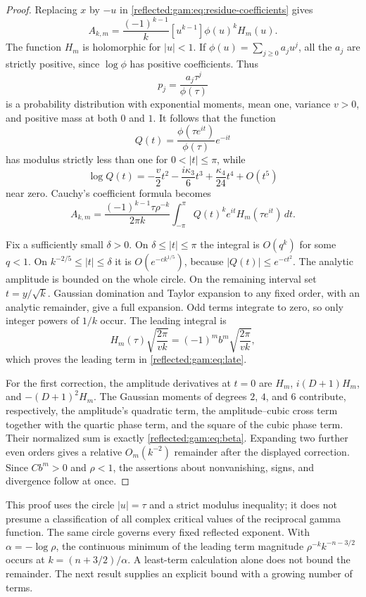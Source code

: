 \begin{proof}
Replacing $x$ by $-u$ in \eqref{reflected:gam:eq:residue-coefficients} gives
\[
 A_{k,m}=\frac{(-1)^{k-1}}k[u^{k-1}]\phi(u)^k H_m(u).
\]
The function $H_m$ is holomorphic for $|u|<1$.  If
$\phi(u)=\sum_{j\ge0}a_ju^j$, all the $a_j$ are strictly positive,
since $\log\phi$ has positive coefficients.  Thus
\[
 p_j=\frac{a_j\tau^j}{\phi(\tau)}
\]
is a probability distribution with exponential moments, mean one,
variance $v>0$, and positive mass at both $0$ and $1$.  It follows
that the function
\[
 Q(t)=\frac{\phi(\tau e^{it})}{\phi(\tau)}e^{-it}
\]
has modulus strictly less than one for $0<|t|\le\pi$, while
\[
 \log Q(t)=-\frac v2t^2-\frac{i\kappa_3}6t^3
 +\frac{\kappa_4}{24}t^4+O(t^5)
\]
near zero.  Cauchy's coefficient formula becomes
\begin{equation}\label{reflected:gam:eq:cauchy}
 A_{k,m}=
 \frac{(-1)^{k-1}\tau\rho^{-k}}{2\pi k}
 \int_{-\pi}^{\pi}Q(t)^k e^{it}H_m(\tau e^{it})\,dt.
\end{equation}

Fix a sufficiently small $\delta>0$.  On $\delta\le|t|\le\pi$
the integral is $O(q^k)$ for some $q<1$.  On
$k^{-2/5}\le|t|\le\delta$ it is $O(e^{-c k^{1/5}})$, because
$|Q(t)|\le e^{-ct^2}$.  The analytic amplitude is bounded on the
whole circle.  On the remaining interval set $t=y/\sqrt{k}$.
Gaussian domination and Taylor expansion to any fixed order, with
an analytic remainder, give a full expansion.  Odd terms integrate
to zero, so only integer powers of $1/k$ occur.  The leading integral is
\[
 H_m(\tau)\sqrt{\frac{2\pi}{vk}}
 =(-1)^m b^m\sqrt{\frac{2\pi}{vk}},
\]
which proves the leading term in \eqref{reflected:gam:eq:late}.

For the first correction, the amplitude derivatives at $t=0$ are
$H_m$, $i(D+1)H_m$, and $-(D+1)^2H_m$.
The Gaussian moments of degrees $2$, $4$, and $6$ contribute,
respectively, the amplitude's quadratic term, the amplitude--cubic
cross term together with the quartic phase term, and the square of
the cubic phase term.  Their normalized sum is exactly
\eqref{reflected:gam:eq:beta}.  Expanding two further even orders gives a
relative $O_m(k^{-2})$ remainder after the displayed correction.
Since $C b^m>0$ and $\rho<1$, the assertions about nonvanishing,
signs, and divergence follow at once.
\end{proof}

This proof uses the circle $|u|=\tau$ and a strict modulus inequality;
it does not presume a classification of all complex critical values
of the reciprocal gamma function.  The same circle governs every fixed
reflected exponent.  With $\alpha=-\log\rho$, the continuous minimum
of the leading term magnitude $\rho^{-k}k^{-n-3/2}$ occurs at
$k=(n+3/2)/\alpha$.  A least-term calculation alone does not bound the
remainder.  The next result supplies an explicit bound with a growing
number of terms.

